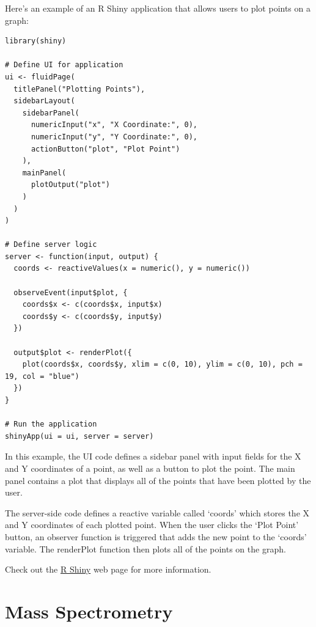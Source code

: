 \documentclass[
]{book}
\begin{document}
Here's an example of an R Shiny application that allows users to plot points on a graph:

\begin{verbatim}
library(shiny)

# Define UI for application
ui <- fluidPage(
  titlePanel("Plotting Points"),
  sidebarLayout(
    sidebarPanel(
      numericInput("x", "X Coordinate:", 0),
      numericInput("y", "Y Coordinate:", 0),
      actionButton("plot", "Plot Point")
    ),
    mainPanel(
      plotOutput("plot")
    )
  )
)

# Define server logic
server <- function(input, output) {
  coords <- reactiveValues(x = numeric(), y = numeric())

  observeEvent(input$plot, {
    coords$x <- c(coords$x, input$x)
    coords$y <- c(coords$y, input$y)
  })

  output$plot <- renderPlot({
    plot(coords$x, coords$y, xlim = c(0, 10), ylim = c(0, 10), pch = 19, col = "blue")
  })
}

# Run the application
shinyApp(ui = ui, server = server)
\end{verbatim}

In this example, the UI code defines a sidebar panel with input fields for the X and Y coordinates of a point, as well as a button to plot the point. The main panel contains a plot that displays all of the points that have been plotted by the user.

The server-side code defines a reactive variable called `coords' which stores the X and Y coordinates of each plotted point. When the user clicks the `Plot Point' button, an observer function is triggered that adds the new point to the `coords' variable. The renderPlot function then plots all of the points on the graph.

Check out the \href{https://shiny.rstudio.com/}{R Shiny} web page for more information.

\hypertarget{mass-spectrometry}{%
\chapter{Mass Spectrometry}\label{mass-spectrometry}}

\hfill\break
\end{document}
